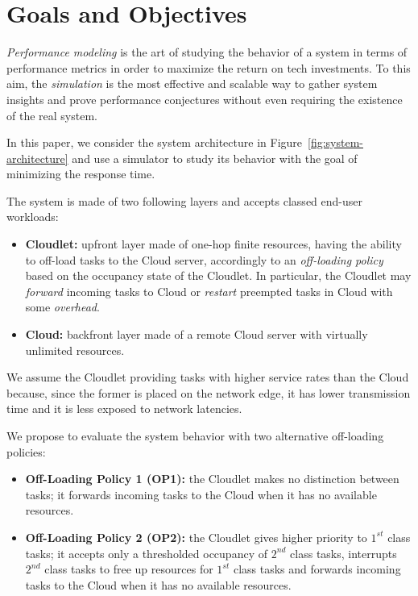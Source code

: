 \section{Goals and Objectives}
\label{sec:performance-modeling-goals-and-objectives}
\textit{Performance modeling} is the art of studying the behavior of a system in terms of performance metrics in order to maximize the return on tech investments.
To this aim, the \textit{simulation} is the most effective and scalable way to gather system insights and prove performance conjectures without even requiring the existence of the real system.

In this paper, we consider the system architecture in Figure~\ref{fig:system-architecture} and use a simulator to study its behavior with the goal of minimizing the response time.

The system is made of two following layers and accepts classed end-user workloads:

\begin{itemize}
		\item \textbf{Cloudlet:} upfront layer made of one-hop finite resources, having the ability to off-load tasks to the Cloud server, accordingly to an \textit{off-loading policy} based on the occupancy state of the Cloudlet. In particular, the Cloudlet may \textit{forward} incoming tasks to Cloud or \textit{restart} preempted tasks in Cloud with some \textit{overhead}. 
		
		\item \textbf{Cloud:} backfront layer made of a remote Cloud server with virtually unlimited resources.
\end{itemize}

We assume the Cloudlet  providing tasks with higher service rates than the Cloud because, since the former is placed on the network edge, it has lower transmission time and it is less exposed to network latencies.

We propose to evaluate the system behavior with two alternative off-loading policies:

\begin{itemize}
	\item \textbf{Off-Loading Policy 1 (OP1):} the Cloudlet makes no distinction between tasks; it forwards incoming tasks to the Cloud when it has no available resources.
	
	\item \textbf{Off-Loading Policy 2 (OP2):} the Cloudlet gives higher priority to $1^{st}$ class tasks; it accepts only a thresholded occupancy of $2^{nd}$ class tasks, interrupts $2^{nd}$ class tasks to free up resources for $1^{st}$ class tasks and forwards incoming tasks to the Cloud when it has no available resources.
\end{itemize}

